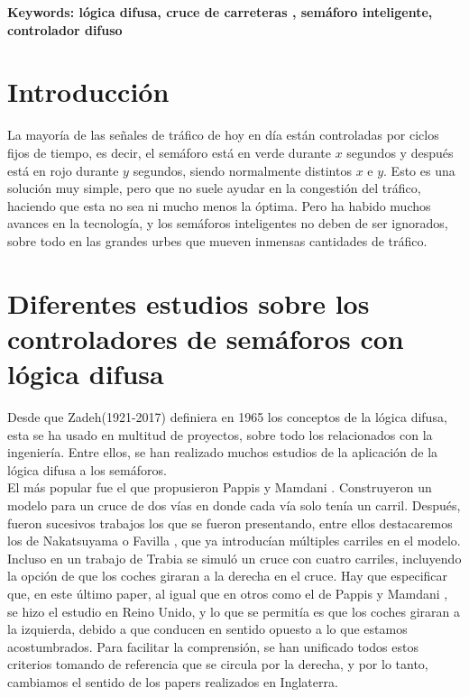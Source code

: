 \textbf{Keywords: lógica difusa, cruce de carreteras , semáforo inteligente, controlador difuso} 

\section{Introducción}

La mayoría de las señales de tráfico de hoy en día están controladas por ciclos fijos de tiempo, es decir, el semáforo está en verde durante $x$ segundos y después está en rojo durante $y$ segundos, siendo normalmente distintos $x$ e $y$. Esto es una solución muy simple, pero que no suele ayudar en la congestión del tráfico, haciendo que esta no sea ni mucho menos la óptima. Pero ha habido muchos avances en la tecnología, y los semáforos inteligentes no deben de ser ignorados, sobre todo en las grandes urbes que mueven inmensas cantidades de tráfico. 

\section{Diferentes estudios sobre los controladores de semáforos con lógica difusa}
Desde que Zadeh(1921-2017) definiera en 1965 los conceptos de la lógica difusa, esta se ha usado en multitud de proyectos, sobre todo los relacionados con la ingeniería. Entre ellos, se han realizado muchos estudios de la aplicación de la lógica difusa a los semáforos.\\

El más popular fue el que propusieron Pappis y Mamdani \cite{Mamdani}. Construyeron un modelo para un cruce de dos vías en donde cada vía solo tenía un carril. Después, fueron sucesivos trabajos los que se fueron presentando, entre ellos destacaremos los de Nakatsuyama \cite{Nakatsuyama} o Favilla \cite{Favilla}, que ya introducían múltiples carriles en el modelo. Incluso en un trabajo de Trabia \cite{Trabia} se simuló un cruce con cuatro carriles, incluyendo la opción de que los coches giraran a la derecha en el cruce. Hay que especificar que, en este último paper, al igual que en otros como el de Pappis y Mamdani \cite{Mamdani}, se hizo el estudio en Reino Unido, y lo que se permitía es que los coches giraran a la izquierda, debido a que conducen en sentido opuesto a lo que estamos acostumbrados. Para facilitar la comprensión, se han unificado todos estos criterios tomando de referencia que se circula por la derecha, y por lo tanto, cambiamos el sentido de los papers realizados en Inglaterra.\\

